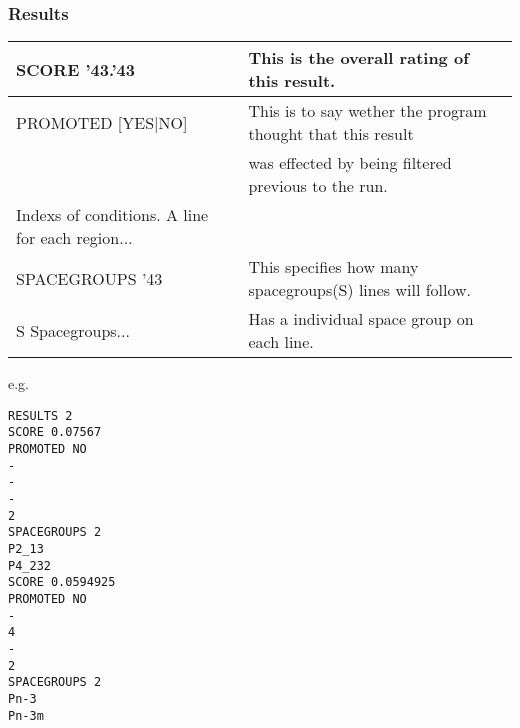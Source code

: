 \documentclass[11pt]{article}
\newcommand{\hash}{\char '43} %
\begin{document}
\subsubsection{Results}
\begin{table}[h]
\begin{tabular}{|l|l|}\hline
SCORE \hash.\hash & This is the overall rating of this result.\\
\hline
PROMOTED [YES|NO] & This is to say wether the program thought that this result\\
	& was effected by being filtered previous to the run.\\
\hline
Indexs of conditions. A line for each region... & \\
\hline
SPACEGROUPS \hash & This specifies how many spacegroups(S) lines will follow.\\
\hline
S Spacegroups...	& Has a individual space group on each line.\\
\hline
\end{tabular}
\end{table}
e.g.
\begin{verbatim}
RESULTS 2
SCORE 0.07567
PROMOTED NO
-
-
-
2
SPACEGROUPS 2
P2_13
P4_232
SCORE 0.0594925
PROMOTED NO
-
4
-
2
SPACEGROUPS 2
Pn-3
Pn-3m
\end{verbatim}
\end{document}

